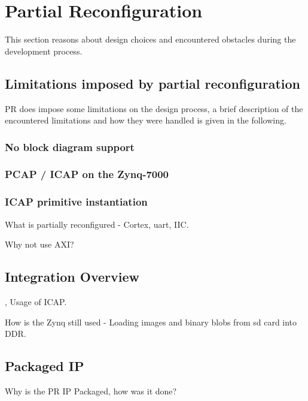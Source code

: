 \section{Partial Reconfiguration}
This section reasons about design choices and encountered obstacles during the development process.

\subsection{Limitations imposed by partial reconfiguration}
\gls{PR} does impose some limitations on the design process, a brief description of the encountered limitations and how they were handled is given in the following.

\subsubsection{No block diagram support}
\subsubsection{PCAP / ICAP on the Zynq-7000}
\subsubsection{ICAP primitive instantiation}

What is partially reconfigured - Cortex, uart, IIC.

Why not use AXI?

\subsection{Integration Overview}
\cite{xilinx_vivado_2018-1}, \cite{xilinx_vivado_2018}
Usage of \gls{ICAP}.

How is the Zynq still used - Loading images and binary blobs from sd card into DDR.

\subsection{Packaged IP}
Why is the PR IP Packaged, how was it done? \cite{xilinx_ug1118-vivado-creating-packaging-custom-ip.pdf_nodate}
